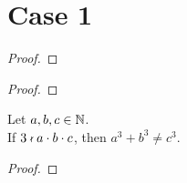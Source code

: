 %
%
%
%

\chapter*{Case 1}

\begin{lemma}
  \label{lmm:cube_of_castHom_ne_zero}
  \leanok
\end{lemma}
\begin{proof}
  \leanok
\end{proof}

\begin{lemma}
  \label{lmm:cube_of_not_dvd}
  \leanok
\end{lemma}
\begin{proof}
  \leanok
\end{proof}

\begin{theorem}
    \label{thm:fermatLastTheoremThree_case_1}
    \leanok
    Let \(a, b, c \in \mathbb{N}\). \\
    If \(3 \nshortmid a \cdot b \cdot c\), then \(a ^ 3 + b ^ 3 \neq c ^ 3\).
\end{theorem}
\begin{proof}
  \leanok
\end{proof}
